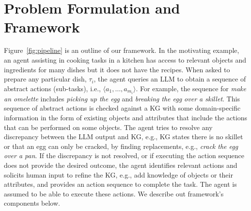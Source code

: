 \section{Problem Formulation and Framework}
\vspace{-0.5em}
\label{sec:framework}
Figure~\ref{fig:pipeline} is an outline of our framework. In the motivating example, an agent assisting in cooking tasks in a kitchen has access to relevant objects and ingredients for many dishes but it does not have the recipes. When asked to prepare any particular dish, $\tau_i$, the agent queries an LLM to obtain a sequence of abstract actions (sub-tasks), i.e., $\langle a_1, \ldots, a_{m_i}\rangle$. For example, the sequence for \textit{make an omelette} includes \textit{picking up the egg} and \textit{breaking the egg over a skillet}. This sequence of abstract actions is checked against a KG with some domain-specific information in the form of existing objects and attributes that include the actions that can be performed on some objects. The agent tries to resolve any discrepancy between the LLM output and KG, e.g., KG states there is no skillet or that an egg can only be cracked, by finding replacements, e.g., \textit{crack the egg over a pan}. If the discrepancy is not resolved, or if executing the action sequence does not provide the desired outcome, the agent identifies relevant actions and solicits human input to refine the KG, e.g., add knowledge of objects or their attributes, and provides an action sequence to complete the task. The agent is assumed to be able to execute these actions. We describe out framework's components below.


